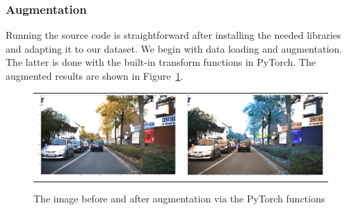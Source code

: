 \documentclass[12pt, landscape]{article}
\begin{document}
\begin{multicols}{3}
\subsubsection{Augmentation}
Running the source code is straightforward after installing the needed libraries
and adapting it to our dataset. We begin with data loading and augmentation. The
latter is done with the built-in transform functions in PyTorch. The augmented
results are shown in Figure~\ref{fig:RCNNaugmentation}. 

\begin{figure}[H]
    \centering
    \begin{tabular}{cc}
    \includegraphics[scale=0.105]{rcnnimg2.png}&
    \includegraphics[scale=0.08]{rcnnimg1.png}\\
    \end{tabular}
    \caption{The image before and after augmentation via the PyTorch functions}
    \label{fig:RCNNaugmentation}
\end{figure}


\end{multicols}
\end{document}
